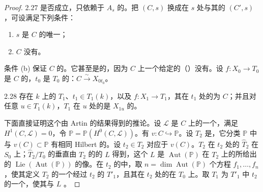 \begin{proof}
2.27 是否成立，只依赖于 $A_s$ 的。把 $(C,s)$ 换成在 $s$ 处与其的 $(C',s)$，可设满足下列条件：
\begin{enumerate}
\item[(a)] $s$ 是 $C$ 的唯一；
\item[(b)] $C$ 没有。
\end{enumerate}
条件 (b) 保证 $C$ 的。它甚至是的，因为 $C$ 上一个给定的（）没有。设 $f:X_0\to T_0$ 是 $C$ 的，$t_0$ 是 $T_0$ 的：$C\xrightarrow{\sim}X_{0t_0}$。

\begin{SGAresult}{}{2.28}
存在 $k$ 上的 $T_1$、$t_1\in T_1(k)$，以及 $f:X_1\to T_1$，其在 $t_1$ 处的为 $C$；并且对任意 $u\in T_1(k)$，$T_1$ 在 $u$ 处的是 $X_{1u}$ 的。
\end{SGAresult}
下面直接证明这个由 Artin 的结果得到的推论。设 $\mathscr L$ 是 $C$ 上的一个，满足 $H^1(C,\mathscr L)=0$，令 $\mathbb P=\mathbb P(H^0(C,\mathscr L))$。有 $v:C\hookrightarrow\mathbb P$。设 $T_2$ 是，它分类 $\mathbb P$ 中与 $v(C)\subset\mathbb P$ 有相同 Hilbert 的。设 $t_2\in T_2$ 对应于 $v(C)$。$T_2$ 在 $t_2$ 处的 $\widehat T_2$ 在 $S_0$ 上；$\widehat T_2/T_0$ 的垂直由 $T_2$ 的的 $L$ 得到，这个 $L$ 是 $\operatorname{Aut}(\mathbb P)$ 在 $T_2$ 上的所给出的 $\operatorname{Lie}(\operatorname{Aut}(\mathbb P))$ 的像。在 $t_2$ 的中，取 $n=\dim\operatorname{Aut}(\mathbb P)$ 个方程 $f_1,\ldots,f_n$，使其定义 $T_2$ 的一个经过 $t_2$ 的 $T'_1$，且其在 $t_2$ 处的在 $T_0$ 上。取 $T_1$ 为 $T'_1$ 中 $t_2$ 的一个，使其与 $L$ 。


\end{proof}
